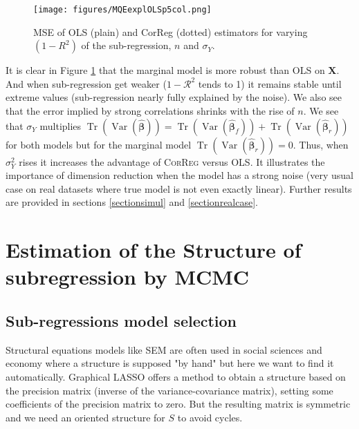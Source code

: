 \documentclass[12pt,a4paper]{report}
\begin{document}
\begin{figure}[h!]
	\texttt{[image: figures/MQEexplOLSp5col.png]}\label{MQE1}
	\caption{MSE of OLS (plain) and CorReg (dotted) estimators for varying $(1-R^2)$ of the sub-regression, $n$ and $\sigma_Y$.}
\end{figure} 
It is clear in Figure \ref{MQE1} that the marginal model is more robust than \textsc{OLS} on $\boldsymbol{X}$. And when sub-regression get weaker ($1-\mathcal{R}^2$ tends to 1) it remains stable until extreme values (sub-regression nearly fully explained by the noise). We also see that the error implied by strong correlations shrinks with the rise of $n$. 
We see that $\sigma_Y$ multiplies $\operatorname{Tr}(\operatorname{Var}(\hat{\boldsymbol{\beta}}))=\operatorname{Tr}(\operatorname{Var}(\hat{\boldsymbol{\beta}}_{f}))+\operatorname{Tr}(\operatorname{Var}(\hat{\boldsymbol{\beta}}_{r}))$ for both models but for the marginal model $\operatorname{Tr}(\operatorname{Var}(\hat{\boldsymbol{\beta}}_{r}))=0$.
 Thus, when $\sigma_Y^2$ rises it increases the advantage of \textsc{CorReg} versus \textsc{OLS}. It illustrates the importance of dimension reduction when the model has a strong noise (very usual case on real datasets where true model is not even exactly linear). Further results are provided in sections \ref{sectionsimul} and \ref{sectionrealcase}.

	
\chapter{Estimation of the Structure of subregression by MCMC}
\section{Sub-regressions model selection}	
Structural equations models like \textsc{SEM} are often used in social sciences and economy where a structure is supposed "by hand" but here we want to find it automatically. Graphical LASSO \cite{friedman2008sparse} offers a method to obtain a structure based on the precision matrix (inverse of the variance-covariance matrix), setting some coefficients of the precision matrix to zero. But the resulting matrix is symmetric and we need an oriented structure for $S$ to avoid cycles.
\end{document}
